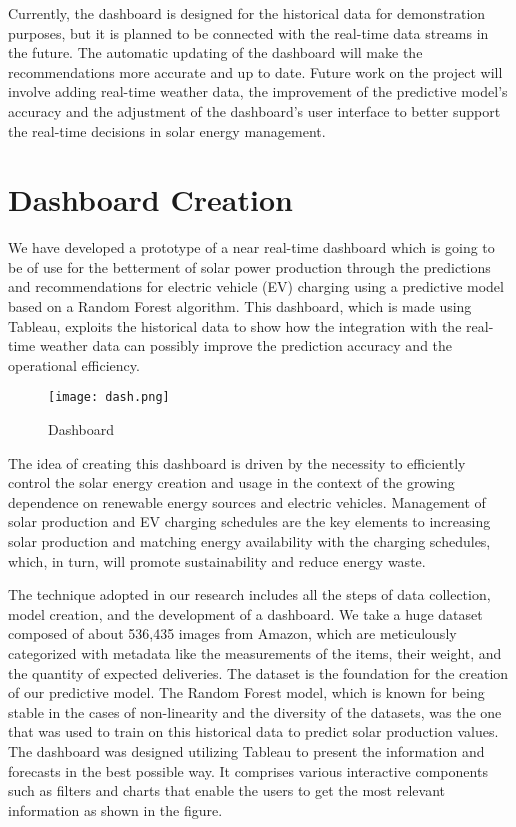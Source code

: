 \documentclass[conference]{IEEEtran}
\begin{document}
\begin{itemize}
Currently, the dashboard is designed for the historical data for demonstration purposes, but it is planned to be connected with the real-time data streams in the future. The automatic updating of the dashboard will make the recommendations more accurate and up to date. Future work on the project will involve adding real-time weather data, the improvement of the predictive model's accuracy and the adjustment of the dashboard's user interface to better support the real-time decisions in solar energy management.
\end{itemize}
\section{Dashboard Creation}
We have developed a prototype of a near real-time dashboard which is going to be of use for the betterment of solar power production through the predictions and recommendations for electric vehicle (EV) charging using a predictive model based on a Random Forest algorithm. This dashboard, which is made using Tableau, exploits the historical data to show how the integration with the real-time weather data can possibly improve the prediction accuracy and the operational efficiency.
\begin{figure}[H] %
    \centering
    \texttt{[image: dash.png]}
    \caption{Dashboard}
    \label{fig:technical_workflow}
\end{figure}
The idea of creating this dashboard is driven by the necessity to efficiently control the solar energy creation and usage in the context of the growing dependence on renewable energy sources and electric vehicles. Management of solar production and EV charging schedules are the key elements to increasing solar production and matching energy availability with the charging schedules, which, in turn, will promote sustainability and reduce energy waste.

The technique adopted in our research includes all the steps of data collection, model creation, and the development of a dashboard. We take a huge dataset composed of about 536,435 images from Amazon, which are meticulously categorized with metadata like the measurements of the items, their weight, and the quantity of expected deliveries. The dataset is the foundation for the creation of our predictive model. The Random Forest model, which is known for being stable in the cases of non-linearity and the diversity of the datasets, was the one that was used to train on this historical data to predict solar production values. The dashboard was designed utilizing Tableau to present the information and forecasts in the best possible way. It comprises various interactive components such as filters and charts that enable the users to get the most relevant information as shown in the figure.
\end{document}
